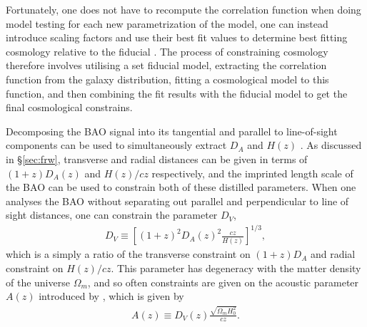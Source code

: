\documentclass[titlesmallcaps, examinerscopy, copyrightpage]{uqthesis}
\begin{document}
Fortunately, one does not have to recompute the correlation function when doing model testing for each new parametrization of the model, one can instead introduce scaling factors and use their best fit values to determine best fitting cosmology relative to the fiducial \citep{SanchezScoccola2012}. The process of constraining cosmology therefore involves utilising a set fiducial model, extracting the correlation function from the galaxy distribution, fitting a cosmological model to this function, and then combining the fit results with the fiducial model to get the final cosmological constrains.






Decomposing the BAO signal into its tangential and parallel to line-of-sight components can be used to simultaneously extract $D_A$ and $H(z)$ \citep{BlakeGlazebrook2003, SeoEisenstein2003, Wang2006}. As discussed in \S\ref{sec:frw}, transverse and radial distances can be given in terms of $(1+z) D_A(z)$ and $H(z)/cz$ respectively, and the imprinted length scale of the BAO can be used to constrain both of these distilled parameters. When one analyses the BAO without separating out parallel and perpendicular to line of sight distances, one can constrain the parameter $D_V$, 
\begin{align}
D_V \equiv \left[ (1+z)^2 D_A(z)^2 \frac{cz}{H(z)}\right]^{1/3},
\end{align}
which is a simply a ratio of the transverse constraint on $(1+z) D_A$ and radial constraint on $H(z)/cz$. This parameter has degeneracy with the matter density of the universe $\Omega_m$, and so often constraints are given on the acoustic parameter $A(z)$ introduced by \citet{EisensteinZehavi2005}, which is given by
\begin{align}
A(z) \equiv D_V(z) \frac{\sqrt{\Omega_m H_0^2}}{cz}.
\end{align}
\end{document}
